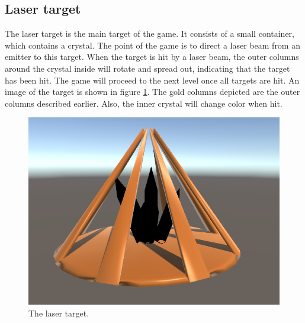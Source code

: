 		\subsection{Laser target} \label{ssec:lasertarget}
			The laser target is the main target of the game. It consists of
			a small container, which contains a crystal. The point of the
			game is to direct a laser beam from an emitter to this target.
			When the target is hit by a laser beam, the outer columns around
			the crystal inside will rotate and spread out, indicating that
			the target has been hit. The game will proceed to the
			next level once all targets are hit. An image of the target is shown in figure 
			\ref{fig:target}. The gold columns depicted are the outer columns
			described earlier. Also, the inner crystal will change color
			when hit.
			\begin{figure}[!ht]
				\centering
				\includegraphics[scale = 0.4]{Target}
				\caption{The laser target.}
				\label{fig:target}
			\end{figure}
			
